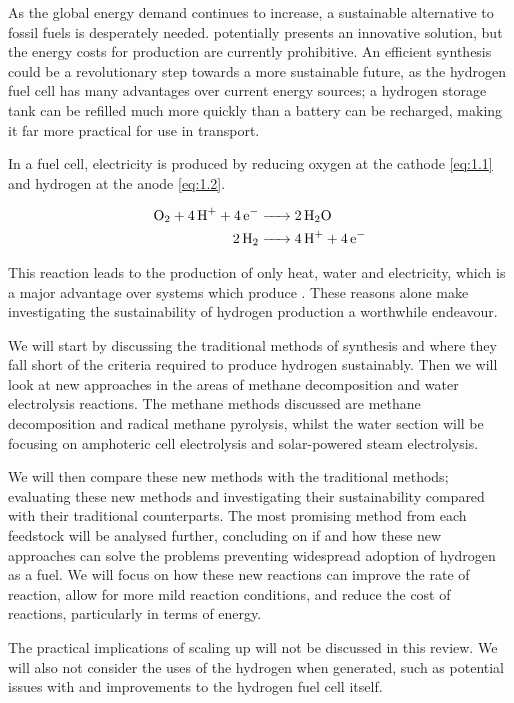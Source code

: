 As the global energy demand continues to increase, a sustainable alternative to fossil fuels is desperately needed.
 potentially presents an innovative solution, but the energy costs for production are currently prohibitive.
An efficient synthesis could be a revolutionary step towards a more sustainable future, as the hydrogen fuel cell has many advantages over current energy sources; a hydrogen storage tank can be refilled much more quickly than a battery can be recharged, \cite{Offer2010} making it far more practical for use in transport.

In a fuel cell, electricity is produced by reducing oxygen at the cathode \eqref{eq:1.1} and hydrogen at the anode \eqref{eq:1.2}.

\begin{align}
	\ce{O2 + 4H+ + 4e- &-> 2H2O}	\label{eq:1.1}\\
	\ce{2H2 &-> 4H+ + 4e-} 		\label{eq:1.2}
\end{align}

This reaction leads to the production of only heat, water and electricity, \cite{6278114} which is a major advantage over systems which produce .
These reasons alone make investigating the sustainability of hydrogen production a worthwhile endeavour.

We will start by discussing the traditional methods of synthesis and where they fall short of the criteria required to produce hydrogen sustainably.
\cite{Saxena2011} Then we will look at new approaches in the areas of methane decomposition and water electrolysis reactions.
The methane methods discussed are methane decomposition and radical methane pyrolysis, whilst the water section will be focusing on amphoteric cell electrolysis and solar-powered steam electrolysis.

We will then compare these new methods with the traditional methods; evaluating these new methods and investigating their sustainability compared with their traditional counterparts.
The most promising method from each feedstock will be analysed further, concluding on if and how these new approaches can solve the problems preventing widespread adoption of hydrogen as a fuel.
We will focus on how these new reactions can improve the rate of reaction, allow for more mild reaction conditions, and reduce the cost of reactions, particularly in terms of energy.

The practical implications of scaling up will not be discussed in this review.
We will also not consider the uses of the hydrogen when generated, such as potential issues with and improvements to the hydrogen fuel cell itself.

